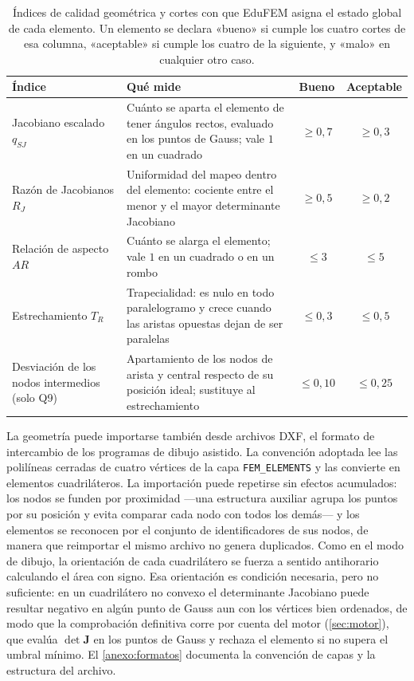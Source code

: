 \begin{table}[H]
\centering
\caption[Índices de calidad geométrica y cortes con que EduFEM clasifica cada elemento.]{Índices de calidad geométrica y cortes con que EduFEM asigna el estado global de cada elemento. Un elemento se declara «bueno» si cumple los cuatro cortes de esa columna, «aceptable» si cumple los cuatro de la siguiente, y «malo» en cualquier otro caso.}
\label{tab:umbrales}
\setlength{\tabcolsep}{4pt}
\begin{tabular}{@{}>{\raggedright\arraybackslash}p{3.3cm} >{\raggedright\arraybackslash}p{6.6cm} cc@{}}
\toprule
\textbf{Índice} & \textbf{Qué mide} & \textbf{Bueno} & \textbf{Aceptable} \\
\midrule
Jacobiano escalado $q_{SJ}$ & Cuánto se aparta el elemento de tener ángulos rectos, evaluado en los puntos de Gauss; vale $1$ en un cuadrado & $\ge 0{,}7$ & $\ge 0{,}3$ \\
Razón de Jacobianos $R_J$ & Uniformidad del mapeo dentro del elemento: cociente entre el menor y el mayor determinante Jacobiano & $\ge 0{,}5$ & $\ge 0{,}2$ \\
Relación de aspecto $AR$ & Cuánto se alarga el elemento; vale $1$ en un cuadrado o en un rombo & $\le 3$ & $\le 5$ \\
Estrechamiento $T_R$ & Trapecialidad: es nulo en todo paralelogramo y crece cuando las aristas opuestas dejan de ser paralelas & $\le 0{,}3$ & $\le 0{,}5$ \\
\midrule
Desviación de los nodos intermedios (solo Q9) & Apartamiento de los nodos de arista y central respecto de su posición ideal; sustituye al estrechamiento & $\le 0{,}10$ & $\le 0{,}25$ \\
\bottomrule
\end{tabular}
{\singlespacing{}}
\end{table}

La geometría puede importarse también desde archivos DXF, el formato de intercambio de los programas de dibujo asistido. La convención adoptada lee las polilíneas cerradas de cuatro vértices de la capa \texttt{FEM\_ELEMENTS} y las convierte en elementos cuadriláteros. La importación puede repetirse sin efectos acumulados: los nodos se funden por proximidad —una estructura auxiliar agrupa los puntos por su posición y evita comparar cada nodo con todos los demás— y los elementos se reconocen por el conjunto de identificadores de sus nodos, de manera que reimportar el mismo archivo no genera duplicados. Como en el modo de dibujo, la orientación de cada cuadrilátero se fuerza a sentido antihorario calculando el área con signo. Esa orientación es condición necesaria, pero no suficiente: en un cuadrilátero no convexo el determinante Jacobiano puede resultar negativo en algún punto de Gauss aun con los vértices bien ordenados, de modo que la comprobación definitiva corre por cuenta del motor (\autoref{sec:motor}), que evalúa $\det\bm{J}$ en los puntos de Gauss y rechaza el elemento si no supera el umbral mínimo. El \autoref{anexo:formatos} documenta la convención de capas y la estructura del archivo.

